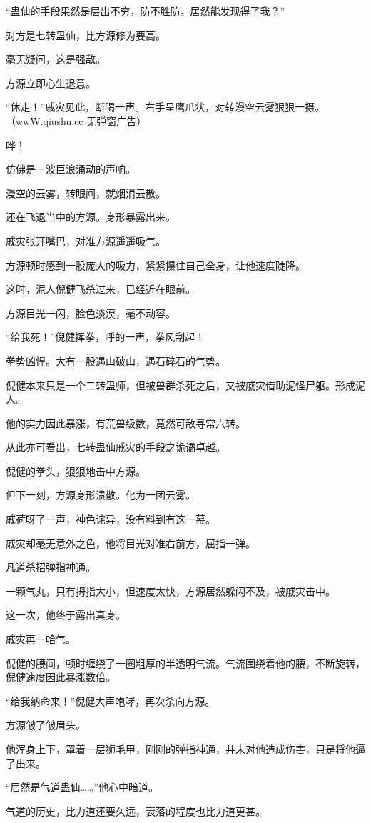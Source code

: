\begin{this_body}
“蛊仙的手段果然是层出不穷，防不胜防。居然能发现得了我？”

对方是七转蛊仙，比方源修为要高。

毫无疑问，这是强敌。

方源立即心生退意。

“休走！”戚灾见此，断喝一声。右手呈鹰爪状，对转漫空云雾狠狠一摄。（wwW.qiushu.cc 无弹窗广告）

哗！

仿佛是一波巨浪涌动的声响。

漫空的云雾，转眼间，就烟消云散。

还在飞退当中的方源。身形暴露出来。

戚灾张开嘴巴，对准方源遥遥吸气。

方源顿时感到一股庞大的吸力，紧紧攥住自己全身，让他速度陡降。

这时，泥人倪健飞杀过来，已经近在眼前。

方源目光一闪，脸色淡漠，毫不动容。

“给我死！”倪健挥拳，呼的一声，拳风刮起！

拳势凶悍。大有一股遇山破山，遇石碎石的气势。

倪健本来只是一个二转蛊师，但被兽群杀死之后，又被戚灾借助泥怪尸躯。形成泥人。

他的实力因此暴涨，有荒兽级数，竟然可敌寻常六转。

从此亦可看出，七转蛊仙戚灾的手段之诡谲卓越。

倪健的拳头，狠狠地击中方源。

但下一刻，方源身形溃散。化为一团云雾。

戚荷呀了一声，神色诧异，没有料到有这一幕。

戚灾却毫无意外之色，他将目光对准右前方，屈指一弹。

凡道杀招弹指神通。

一颗气丸，只有拇指大小，但速度太快，方源居然躲闪不及，被戚灾击中。

这一次，他终于露出真身。

戚灾再一哈气。

倪健的腰间，顿时缠绕了一圈粗厚的半透明气流。气流围绕着他的腰，不断旋转，倪健速度因此暴涨数倍。

“给我纳命来！”倪健大声咆哮，再次杀向方源。

方源皱了皱眉头。

他浑身上下，罩着一层狮毛甲，刚刚的弹指神通，并未对他造成伤害，只是将他逼了出来。

“居然是气道蛊仙……”他心中暗道。

气道的历史，比力道还要久远，衰落的程度也比力道更甚。


\end{this_body}
